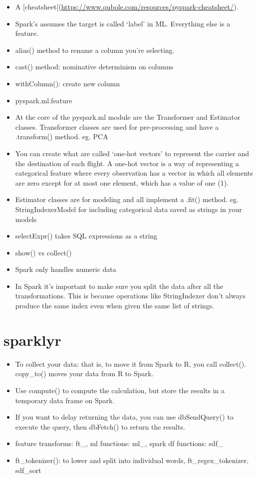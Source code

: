 \documentclass[]{book}
\begin{document}
\begin{itemize}
\item
  A
  {[}cheatsheet{[}(\url{https://www.qubole.com/resources/pyspark-cheatsheet/}).
\item
  Spark's assumes the target is called `label' in ML. Everything else is
  a feature.
\item
  alias() method to rename a column you're selecting.
\item
  cast() method: nominative determinism on columns
\item
  withColumn(): create new column
\item
  pyspark.ml.feature
\item
  At the core of the pyspark.ml module are the Transformer and Estimator
  classes. Transformer classes are used for pre-processing and have a
  .transform() method. eg. PCA
\item
  You can create what are called `one-hot vectors' to represent the
  carrier and the destination of each flight. A one-hot vector is a way
  of representing a categorical feature where every observation has a
  vector in which all elements are zero except for at most one element,
  which has a value of one (1).
\item
  Estimator classes are for modeling and all implement a .fit() method.
  eg. StringIndexerModel for including categorical data saved as strings
  in your models
\item
  selectExpr() takes SQL expressions as a string
\item
  show() vs collect()
\item
  Spark only handles numeric data
\item
  In Spark it's important to make sure you split the data after all the
  transformations. This is because operations like StringIndexer don't
  always produce the same index even when given the same list of
  strings.
\end{itemize}

\section{sparklyr}\label{sparklyr}

\begin{itemize}
\item
  To collect your data: that is, to move it from Spark to R, you call
  collect(). copy\_to() moves your data from R to Spark.
\item
  Use compute() to compute the calculation, but store the results in a
  temporary data frame on Spark.
\item
  If you want to delay returning the data, you can use dbSendQuery() to
  execute the query, then dbFetch() to return the results.
\item
  feature transforms: ft\_, ml functions: ml\_, spark df functions:
  sdf\_
\item
  ft\_tokenizer(): to lower and split into individual words,
  ft\_regex\_tokenizer, sdf\_sort
\end{itemize}
\end{document}
